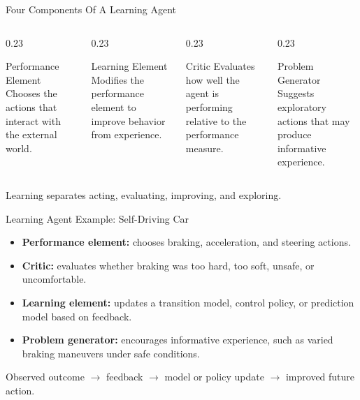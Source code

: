 \documentclass[aspectratio=169,10pt]{beamer}
\begin{document}
\begin{frame}{Four Components Of A Learning Agent}
  \begin{columns}[T,onlytextwidth]
    \begin{column}{0.23\textwidth}
      \begin{block}{Performance Element}
        Chooses the actions that interact with the external world.
      \end{block}
    \end{column}
    \begin{column}{0.23\textwidth}
      \begin{block}{Learning Element}
        Modifies the performance element to improve behavior from experience.
      \end{block}
    \end{column}
    \begin{column}{0.23\textwidth}
      \begin{block}{Critic}
        Evaluates how well the agent is performing relative to the performance measure.
      \end{block}
    \end{column}
    \begin{column}{0.23\textwidth}
      \begin{block}{Problem Generator}
        Suggests exploratory actions that may produce informative experience.
      \end{block}
    \end{column}
  \end{columns}
  \vspace{0.1in}
  \begin{keyidea}
    Learning separates acting, evaluating, improving, and exploring.
  \end{keyidea}
\end{frame}

\begin{frame}{Learning Agent Example: Self-Driving Car}
  \begin{itemize}
    \item \textbf{Performance element:} chooses braking, acceleration, and steering actions.
    \item \textbf{Critic:} evaluates whether braking was too hard, too soft, unsafe, or uncomfortable.
    \item \textbf{Learning element:} updates a transition model, control policy, or prediction model based on feedback.
    \item \textbf{Problem generator:} encourages informative experience, such as varied braking maneuvers under safe conditions.
  \end{itemize}
  \vspace{0.1in}
  \begin{exampleblockcp}
    Observed outcome $\rightarrow$ feedback $\rightarrow$ model or policy update $\rightarrow$ improved future action.
  \end{exampleblockcp}
\end{frame}
\end{document}
